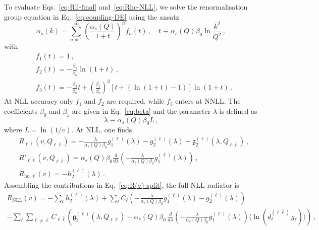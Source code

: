 To evaluate Eqs.~\eqref{eq:Rll-final} and~\eqref{eq:Rhc-NLL}, we solve the renormalisation group equation in Eq.~\eqref{eq:coupling-DE} using the ansatz
\begin{equation}
\label{eq:ansatz}
	\alpha_s(k)=\sum_{n=1}^\infty\left(\frac{\alpha_s(Q)}{1+t}\right)^nf_n(t)\,,\quad t\equiv\alpha_s(Q)\beta_0\ln\frac{k^2}{Q^2}\,,
\end{equation}
with
\begin{subequations}
\begin{align}
&f_1(t)=1\,, \\
&f_2(t)=-\frac{\beta_1}{\beta_0}\ln(1+t)\,, \\
&f_3(t)=-\frac{\beta_2}{\beta_0}t+\left(\frac{\beta_1}{\beta_0}\right)^2[t+(\ln(1+t)-1)]\ln(1+t)\,.
\end{align}
\end{subequations}
At NLL accuracy only $f_1$ and $f_2$ are required, while $f_3$
enters at NNLL. The coefficients  $\beta_0$ and $\beta_1$ are given in Eq.~\eqref{eq:beta}
and the parameter $\lambda$ is defined as
\begin{equation}
\label{eq:lambda}
\lambda \equiv \alpha_s(Q)\beta_0 L\,, 
\end{equation} 
where $L = \ln(1/v)$. At NLL, one finds
\begin{subequations}
\begin{align}
	&R_{\ell\bar \ell}(v,Q_{\ell\bar \ell})=-\frac{\lambda}{\alpha_s(Q)\beta_0}g_1^{(\ell)}(\lambda)-g_2^{(\ell)}(\lambda)-\mathfrak{g}_2^{(\ell)}(\lambda,Q_{\ell\bar\ell})\,,\\
	&R'_{\ell\bar \ell}(v,Q_{\ell\bar \ell})=\alpha_s(Q)\beta_0\frac{d}{d\lambda}\left(-\frac{\lambda}{\alpha_s(Q)\beta_0}g_1^{(\ell)}(\lambda)\right)\,,\\
	&R_{\mathrm{hc},\ell}(v)=-h_2^{(\ell)}(\lambda)\,.
\end{align}
\end{subequations}
Assembling the contributions in Eq.~\eqref{eq:R(v)-split}, the full
NLL radiator is 
\begin{multline}
\label{eq:RNLL}
    R_{\mathrm{NLL}}(v)
    = -\sum_\ell h_2^{(\ell)}(\lambda)
      +\sum_\ell C_\ell\!
       \left(
         -\frac{\lambda}{\alpha_s(Q)\beta_0}
         g_1^{(\ell)}(\lambda)
         -g_2^{(\ell)}(\lambda)
       \right)\\
    -\sum_\ell\sum_{\bar\ell\neq\ell}
      C_{\ell\bar\ell}\!
      \left(
        \mathfrak{g}_2^{(\ell)}(\lambda,Q_{\ell\bar\ell})
        -\alpha_s(Q)\beta_0\,
         \frac{d}{d\lambda}\!\left(
           -\frac{\lambda}{\alpha_s(Q)\beta_0}
           g_1^{(\ell)}(\lambda)
         \right)
         \langle\ln(d^{(\ell\bar\ell)}_\ell\,g_\ell)\rangle
      \right)\,,
\end{multline}
